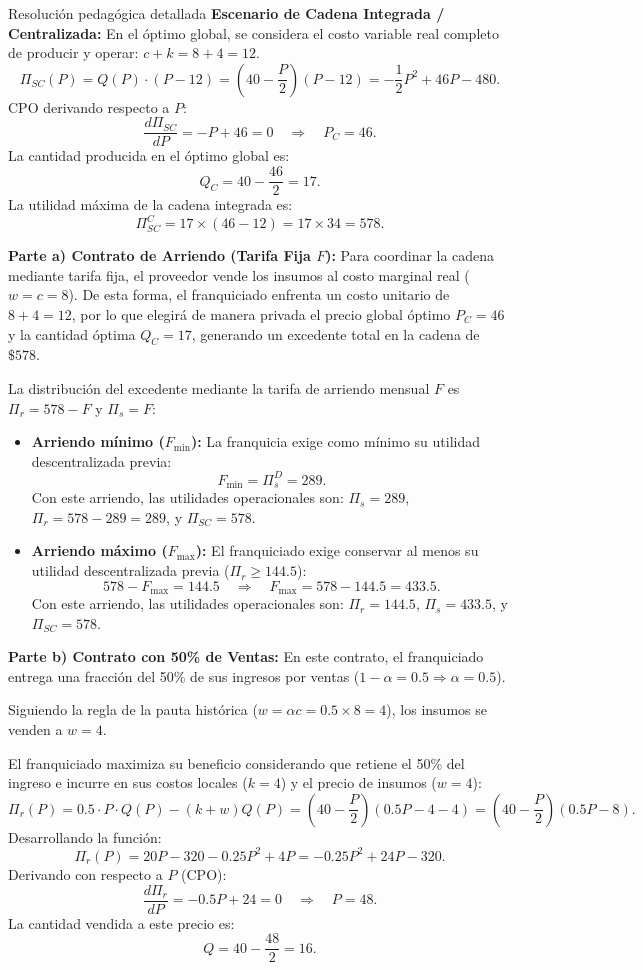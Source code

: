 \documentclass[11pt,a4paper]{article}
\begin{document}
\begin{pauta}{Resolución pedagógica detallada}
\textbf{Escenario de Cadena Integrada / Centralizada:}
En el óptimo global, se considera el costo variable real completo de producir y operar: \(c + k = 8 + 4 = 12\).
\[
\Pi_{SC}(P) = Q(P) \cdot (P - 12) = \left(40 - \frac{P}{2}\right)(P - 12) = -\frac{1}{2}P^2 + 46P - 480.
\]
CPO derivando respecto a \(P\):
\[
\frac{d\Pi_{SC}}{dP} = -P + 46 = 0 \quad\Rightarrow\quad \boxed{P_C = 46.}
\]
La cantidad producida en el óptimo global es:
\[
Q_C = 40 - \frac{46}{2} = \boxed{17.}
\]
La utilidad máxima de la cadena integrada es:
\[
\Pi_{SC}^C = 17 \times (46 - 12) = 17 \times 34 = \boxed{578.}
\]

\textbf{Parte a) Contrato de Arriendo (Tarifa Fija \(F\)):}
Para coordinar la cadena mediante tarifa fija, el proveedor vende los insumos al costo marginal real (\(w = c = 8\)). De esta forma, el franquiciado enfrenta un costo unitario de \(8 + 4 = 12\), por lo que elegirá de manera privada el precio global óptimo \(P_C = 46\) y la cantidad óptima \(Q_C = 17\), generando un excedente total en la cadena de \(\$578\).

La distribución del excedente mediante la tarifa de arriendo mensual \(F\) es \(\Pi_r = 578 - F\) y \(\Pi_s = F\):
\begin{itemize}[itemsep=2pt]
    \item \textbf{Arriendo mínimo (\(F_{\min}\)):} La franquicia exige como mínimo su utilidad descentralizada previa:
    \[
    F_{\min} = \Pi_s^D = 289.
    \]
    Con este arriendo, las utilidades operacionales son: \(\Pi_s = 289\), \(\Pi_r = 578 - 289 = 289\), y \(\Pi_{SC} = 578\).
    
    \item \textbf{Arriendo máximo (\(F_{\max}\)):} El franquiciado exige conservar al menos su utilidad descentralizada previa (\(\Pi_r \ge 144.5\)):
    \[
    578 - F_{\max} = 144.5 \quad\Rightarrow\quad F_{\max} = 578 - 144.5 = 433.5.
    \]
    Con este arriendo, las utilidades operacionales son: \(\Pi_r = 144.5\), \(\Pi_s = 433.5\), y \(\Pi_{SC} = 578\).
\end{itemize}

\textbf{Parte b) Contrato con 50\% de Ventas:}
En este contrato, el franquiciado entrega una fracción del 50\% de sus ingresos por ventas (\(1 - \alpha = 0.5 \Rightarrow \alpha = 0.5\)).

Siguiendo la regla de la pauta histórica (\(w = \alpha c = 0.5 \times 8 = 4\)), los insumos se venden a \(w = 4\).

El franquiciado maximiza su beneficio considerando que retiene el 50\% del ingreso e incurre en sus costos locales (\(k=4\)) y el precio de insumos (\(w=4\)):
\[
\Pi_r(P) = 0.5 \cdot P \cdot Q(P) - (k + w)Q(P) = \left(40 - \frac{P}{2}\right)(0.5P - 4 - 4) = \left(40 - \frac{P}{2}\right)(0.5P - 8).
\]
Desarrollando la función:
\[
\Pi_r(P) = 20P - 320 - 0.25P^2 + 4P = -0.25P^2 + 24P - 320.
\]
Derivando con respecto a \(P\) (CPO):
\[
\frac{d\Pi_r}{dP} = -0.5P + 24 = 0 \quad\Rightarrow\quad \boxed{P = 48.}
\]
La cantidad vendida a este precio es:
\[
Q = 40 - \frac{48}{2} = \boxed{16.}
\]


\end{pauta}
\end{document}
